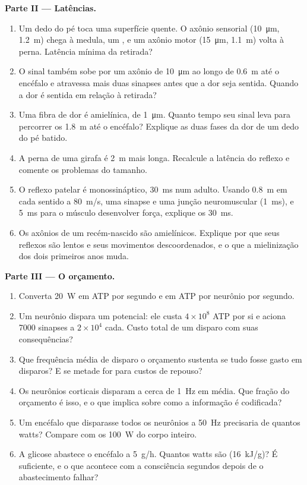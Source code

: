 \begin{problem}
\medskip
\noindent\textbf{Parte II --- Latências.}
\begin{enumerate}[resume]
  \item Um dedo do pé toca uma superfície quente. O axônio sensorial
        (\qty{10}{\micro m}, \qty{1.2}{m}) chega à medula, um
        , e um axônio motor (\qty{15}{\micro m},
        \qty{1.1}{m}) volta à perna. Latência mínima da retirada?
  \item O sinal também sobe por um axônio de \qty{10}{\micro m} ao longo
        de \qty{0.6}{m} até o encéfalo e atravessa mais duas sinapses
        antes que a dor seja sentida. Quando a dor é sentida em relação
        à retirada?
  \item Uma fibra de dor é amielínica, de \qty{1}{\micro m}. Quanto tempo
        seu sinal leva para percorrer os \qty{1.8}{m} até o encéfalo?
        Explique as duas fases da dor de um dedo do pé batido.
  \item A perna de uma girafa é \qty{2}{m} mais longa. Recalcule a
        latência do reflexo e comente os problemas do tamanho.
  \item O reflexo patelar é monossináptico, \qty{30}{ms} num adulto.
        Usando \qty{0.8}{m} em cada sentido a \qty{80}{m/s}, uma sinapse
        e uma junção neuromuscular (\qty{1}{ms}), e \qty{5}{ms} para o
        músculo desenvolver força, explique os \qty{30}{ms}.
  \item Os axônios de um recém-nascido são amielínicos. Explique por que
        seus reflexos são lentos e seus movimentos descoordenados, e o
        que a mielinização dos dois primeiros anos muda.
\end{enumerate}

\medskip
\noindent\textbf{Parte III --- O orçamento.}
\begin{enumerate}[resume]
  \item Converta \qty{20}{W} em ATP por segundo e em ATP por neurônio
        por segundo.
  \item Um neurônio dispara um potencial: ele custa $4\times 10^{8}$ ATP
        por si e aciona \num{7000} sinapses a $2\times 10^{4}$ cada.
        Custo total de um disparo com suas consequências?
  \item Que frequência média de disparo o orçamento sustenta se tudo
        fosse gasto em disparos? E se metade for para custos de repouso?
  \item Os neurônios corticais disparam a cerca de \qty{1}{Hz} em média.
        Que fração do orçamento é isso, e o que implica sobre como a
        informação é codificada?
  \item Um encéfalo que disparasse todos os neurônios a \qty{50}{Hz}
        precisaria de quantos watts? Compare com os \qty{100}{W} do corpo
        inteiro.
  \item A glicose abastece o encéfalo a \qty{5}{g/h}. Quantos watts são
        (\qty{16}{kJ/g})? É suficiente, e o que acontece com a
        consciência segundos depois de o abastecimento falhar?
\end{enumerate}


\end{problem}
